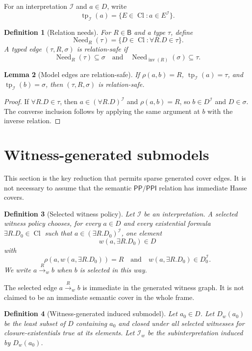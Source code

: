 \documentclass[11pt]{article}
\newtheorem{definition}{Definition}[section]
\newtheorem{lemma}[definition]{Lemma}
\theoremstyle{remark}
\newcommand{\Base}{\mathsf{B}}
\newcommand{\PP}{\mathsf{PP}}
\newcommand{\PPI}{\mathsf{PPI}}
\newcommand{\Inv}{\operatorname{inv}}
\newcommand{\Cl}{\operatorname{Cl}}
\newcommand{\tp}{\operatorname{tp}}
\newcommand{\Need}{\operatorname{Need}}
\newcommand{\I}{\mathcal{I}}
\begin{document}
For an interpretation $\I$ and $a\in D$, write
\[
\tp_\I(a)=\{E\in\Cl:a\in E^\I\}.
\]

\begin{definition}[Relation needs]
For $R\in\Base$ and a type $\tau$, define
\[
\Need_R(\tau)=\{D\in\Cl: \forall R.D\in\tau\}.
\]
A typed edge $(\tau,R,\sigma)$ is relation-safe if
\[
\Need_R(\tau)\subseteq\sigma
\quad\text{and}\quad
\Need_{\Inv(R)}(\sigma)\subseteq\tau.
\]
\end{definition}

\begin{lemma}[Model edges are relation-safe]\label{lem:model-safe}
If $\rho(a,b)=R$, $\tp_\I(a)=\tau$, and $\tp_\I(b)=\sigma$, then $(\tau,R,\sigma)$ is relation-safe.
\end{lemma}
\begin{proof}
If $\forall R.D\in\tau$, then $a\in(\forall R.D)^\I$ and $\rho(a,b)=R$, so $b\in D^\I$ and $D\in\sigma$.  The converse inclusion follows by applying the same argument at $b$ with the inverse relation.
\end{proof}

\section{Witness-generated submodels}
This section is the key reduction that permits sparse generated cover edges.  It is not necessary to assume that the semantic $\PP/\PPI$ relation has immediate Hasse covers.

\begin{definition}[Selected witness policy]
Let $\I$ be an interpretation.  A selected witness policy chooses, for every $a\in D$ and every existential formula $\exists R.D_0\in\Cl$ such that $a\in(\exists R.D_0)^\I$, one element
\[
w(a,\exists R.D_0)\in D
\]
with
\[
\rho(a,w(a,\exists R.D_0))=R
\quad\text{and}\quad
w(a,\exists R.D_0)\in D_0^\I.
\]
We write $a\xrightarrow{R}_{w} b$ when $b$ is selected in this way.
\end{definition}

The selected edge $a\xrightarrow{R}_{w}b$ is immediate in the generated witness graph.  It is not claimed to be an immediate semantic cover in the whole frame.

\begin{definition}[Witness-generated induced submodel]
Let $a_0\in D$.  Let $D_w(a_0)$ be the least subset of $D$ containing $a_0$ and closed under all selected witnesses for closure-existentials true at its elements.  Let $\I_w$ be the subinterpretation induced by $D_w(a_0)$.
\end{definition}
\end{document}
